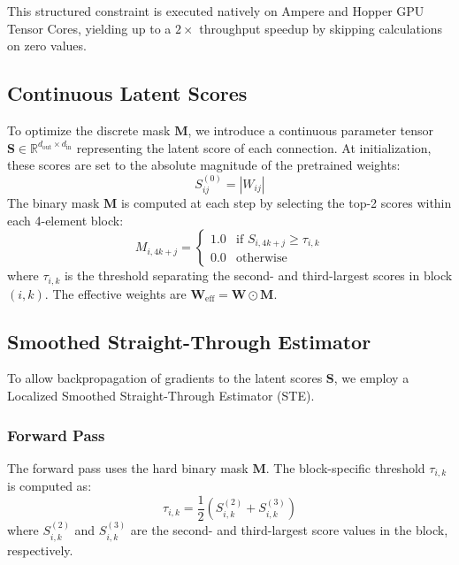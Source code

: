 \documentclass[11pt]{article}
\newcommand{\R}{\mathbb{R}}
\begin{document}
This structured constraint is executed natively on Ampere and Hopper GPU Tensor Cores, yielding up to a $2\times$ throughput speedup by skipping calculations on zero values.

\subsection{Continuous Latent Scores}\label{subsec:scores}

To optimize the discrete mask $\bm{M}$, we introduce a continuous parameter tensor $\bm{S} \in \R^{d_{\text{out}} \times d_{\text{in}}}$ representing the latent score of each connection. At initialization, these scores are set to the absolute magnitude of the pretrained weights:
\begin{equation}\label{eq:score_init}
    S_{ij}^{(0)} = |W_{ij}|
\end{equation}
The binary mask $\bm{M}$ is computed at each step by selecting the top-2 scores within each 4-element block:
\begin{equation}\label{eq:mask_gen}
    M_{i, 4k+j} = \begin{cases}
        1.0 & \text{if } S_{i, 4k+j} \ge \tau_{i, k} \\
        0.0 & \text{otherwise}
    \end{cases}
\end{equation}
where $\tau_{i, k}$ is the threshold separating the second- and third-largest scores in block $(i, k)$. The effective weights are $\bm{W}_{\text{eff}} = \bm{W} \odot \bm{M}$.

\subsection{Smoothed Straight-Through Estimator}\label{subsec:ste}

To allow backpropagation of gradients to the latent scores $\bm{S}$, we employ a Localized Smoothed Straight-Through Estimator (STE).

\subsubsection{Forward Pass}
The forward pass uses the hard binary mask $\bm{M}$. The block-specific threshold $\tau_{i, k}$ is computed as:
\begin{equation}\label{eq:tau}
    \tau_{i, k} = \frac{1}{2} \left( S_{i, k}^{(2)} + S_{i, k}^{(3)} \right)
\end{equation}
where $S_{i, k}^{(2)}$ and $S_{i, k}^{(3)}$ are the second- and third-largest score values in the block, respectively.
\end{document}
